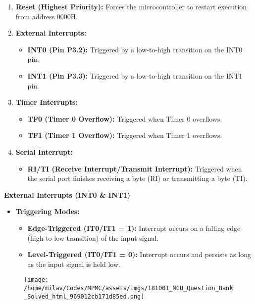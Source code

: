 \documentclass[
]{article}
\begin{document}
\begin{enumerate}
\def\labelenumi{\arabic{enumi}.}
\item
  \textbf{Reset (Highest Priority):} Forces the microcontroller to
  restart execution from address 0000H.
\item
  \textbf{External Interrupts:}

  \begin{itemize}
  \item
    \textbf{INT0 (Pin P3.2):} Triggered by a low-to-high transition on
    the INT0 pin.
  \item
    \textbf{INT1 (Pin P3.3):} Triggered by a low-to-high transition on
    the INT1 pin.
  \end{itemize}
\item
  \textbf{Timer Interrupts:}

  \begin{itemize}
  \item
    \textbf{TF0 (Timer 0 Overflow):} Triggered when Timer 0 overflows.
  \item
    \textbf{TF1 (Timer 1 Overflow):} Triggered when Timer 1 overflows.
  \end{itemize}
\item
  \textbf{Serial Interrupt:}

  \begin{itemize}
  \item
    \textbf{RI/TI (Receive Interrupt/Transmit Interrupt):} Triggered
    when the serial port finishes receiving a byte (RI) or transmitting
    a byte (TI).
  \end{itemize}
\end{enumerate}

\textbf{External Interrupts (INT0 \& INT1)}

\begin{itemize}
\item
  \textbf{Triggering Modes:}

  \begin{itemize}
  \item
    \textbf{Edge-Triggered (IT0/IT1 = 1):} Interrupt occurs on a falling
    edge (high-to-low transition) of the input signal.
  \item
    \textbf{Level-Triggered (IT0/IT1 = 0):} Interrupt occurs and
    persists as long as the input signal is held low.
  \end{itemize}
\end{itemize}

\begin{figure}
\centering
\texttt{[image: /home/milav/Codes/MPMC/assets/imgs/181001\_MCU\_Question\_Bank\_Solved\_html\_969012cb171d85ed.png]}
\caption{}
\end{figure}
\end{document}
